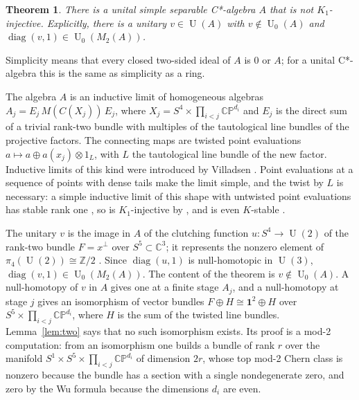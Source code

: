 \documentclass[11pt]{amsart}
\newcommand{\leanverified}[2]{\ignorespaces}
\theoremstyle{plain}
\newtheorem{mainthm}{Theorem}
\theoremstyle{definition}
\newcommand{\C}{\mathbb C}
\newcommand{\CP}{\mathbb{CP}}
\newcommand{\U}{\operatorname{U}}
\newcommand{\Uz}{\operatorname{U}_0}
\begin{document}
\begin{mainthm}
\label{thm:main}
There is a unital simple separable C*-algebra $A$ that is not
$K_1$-injective.  Explicitly, there is a unitary $v \in \U(A)$ with
$v \notin \Uz(A)$ and $\operatorname{diag}(v,1) \in \Uz(M_2(A))$.
\leanverified{thm:main}{GroupApproximation.NinetyNineProblems.not\_problemLIX}
\leanverified{thm:main-separable}{GroupApproximation.NinetyNineProblems.exists\_separable\_simple\_unital\_not\_k1Inj}
\end{mainthm}

Simplicity means that every closed two-sided ideal of $A$ is $0$ or $A$; for
a unital C*-algebra this is the same as simplicity as a ring.

The algebra $A$ is an inductive limit of homogeneous algebras
$A_j = E_j\, M(C(X_j))\, E_j$, where $X_j = S^4 \times \prod_{i<j} \CP^{d_i}$
and $E_j$ is the direct sum of a trivial rank-two bundle with multiples of the
tautological line bundles of the projective factors.  The connecting maps are
twisted point evaluations $a \mapsto a \oplus a(x_j) \otimes 1_{L}$, with $L$
the tautological line bundle of the new factor.  Inductive limits of this kind
were introduced by Villadsen \cite{Vi98,Vi99}.  Point evaluations at a sequence
of points with dense tails make the limit simple, and the twist by $L$ is
necessary: a simple inductive limit of this shape with untwisted point
evaluations has stable rank one \cite{EHT}, so is $K_1$-injective by
\cite{Ri}, and is even $K$-stable \cite{Se}.

The unitary $v$ is the image in $A$ of the clutching function
$u \colon S^4 \to \U(2)$ of the rank-two bundle $F = x^{\perp}$ over
$S^5 \subset \C^3$; it represents the nonzero element of
$\pi_4(\U(2)) \cong \mathbb Z/2$ \cite{Bo}.  Since $\operatorname{diag}(u,1)$
is null-homotopic in $\U(3)$, $\operatorname{diag}(v,1) \in \Uz(M_2(A))$.  The
content of the theorem is $v \notin \Uz(A)$.  A null-homotopy of $v$ in $A$
gives one at a finite stage $A_j$, and a null-homotopy at stage $j$ gives an
isomorphism of vector bundles $F \oplus H \cong \mathbf 1^2 \oplus H$ over
$S^5 \times \prod_{i<j} \CP^{d_i}$, where $H$ is the sum of the twisted line
bundles.  Lemma~\ref{lem:two} says that no such isomorphism exists.  Its proof
is a mod-2 computation: from an isomorphism one builds a bundle of rank $r$
over the manifold $S^1 \times S^5 \times \prod_{i<j} \CP^{d_i}$ of dimension
$2r$, whose top mod-2 Chern class is nonzero because the bundle has a section
with a single nondegenerate zero, and zero by the Wu formula because the
dimensions $d_i$ are even.
\end{document}
